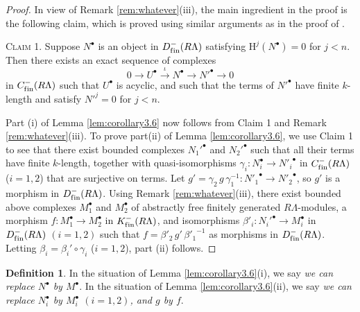 \documentclass{amsart}
\theoremstyle{plain}
\theoremstyle{definition}
\newtheorem{dfn}[thm]{Definition}
\theoremstyle{remark}
\begin{document}
\begin{proof}
In view of Remark \ref{rem:whatever}(iii), the main ingredient in the proof is the following claim,
which is proved using similar arguments  as
in the proof of \cite[Lemma 3.4(i)]{bcderived}.

\medskip

\noindent
\textsc{Claim 1.} 
Suppose  $N^\bullet$ is an object in  $D^{-}_{\mathrm{f\/in}}(R\Lambda)$ satisfying
${\mathrm{H}}^j(N^\bullet)=0$ for $j<n$. Then there exists an exact sequence of complexes
\begin{equation}
\label{eq:cutting}
0 \to U^\bullet \xrightarrow{\iota} N^\bullet \to  {N'}^\bullet \to 0
\end{equation}
in $C^{-}_{\mathrm{f\/in}}(R\Lambda)$ such that $U^\bullet$ is acyclic, and such that the terms of ${N'}^\bullet$
have finite $k$-length and satisfy ${N'}^j=0$ for $j<n$. 

\medskip

Part (i) of Lemma \ref{lem:corollary3.6} now follows from Claim 1 and Remark \ref{rem:whatever}(iii).
To prove part(ii) of Lemma \ref{lem:corollary3.6}, we use Claim 1 to see that
there exist bounded complexes
${N_1'}^\bullet$ and ${N_2'}^\bullet$ such that all their terms have finite $k$-length, together
with quasi-isomorphisms $\gamma_i:N_i^\bullet \to {N'_i}^\bullet$ in $C^{-}_{\mathrm{f\/in}}(R\Lambda)$
($i=1,2$) that are surjective on terms. Let $g'=\gamma_2 \,g \, \gamma_1^{-1}:{N'_1}^\bullet
\to {N'_2}^\bullet$, so $g'$ is a morphism in $D^{-}_{\mathrm{f\/in}}(R\Lambda)$.
Using Remark \ref{rem:whatever}(iii),
there exist bounded above complexes $M_1^\bullet$ and $M_2^\bullet$ of 
abstractly free finitely generated $R\Lambda$-modules, a morphism
$f:M_1^\bullet \to M_2^\bullet$ in $K^-_{\mathrm{f\/in}}(R\Lambda)$, and
isomorphisms $\beta'_i:{N_i'}^\bullet \to M_i^\bullet$ in
$D^{-}_{\mathrm{f\/in}}(R\Lambda)$ $(i=1,2)$ such that $f = \beta'_{2}\, g'\,
{\beta'_1}^{-1}$ as morphisms in $D^{-}_{\mathrm{f\/in}}(R\Lambda)$. Letting $\beta_i=\beta_i'\circ\gamma_i$
($i=1,2$), part (ii) follows.
\end{proof}

\begin{dfn}
\label{def:Definition3.7}
In the situation of Lemma \ref{lem:corollary3.6}(i), we say \emph{we can replace $N^\bullet$
by  $M^\bullet$}. In the situation of Lemma \ref{lem:corollary3.6}(ii), we say
\emph{we can replace $N_i^\bullet$ by $M_i^\bullet$ $(i=1,2)$, and 
$g$ by $f$}.
\end{dfn}
\end{document}
